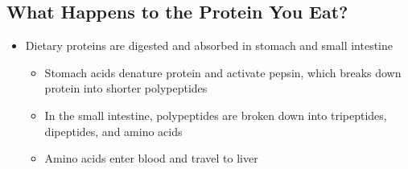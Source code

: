 \documentclass[12pt]{article}
\begin{document}
        \subsection{What Happens to the Protein You Eat?}
            \begin{itemize}
                \item Dietary proteins are digested and absorbed in stomach and small intestine
                    \begin{itemize}
                        \item Stomach acids denature protein and activate pepsin, which breaks down protein into shorter polypeptides
                        \item In the small intestine, polypeptides are broken down into tripeptides, dipeptides, and amino acids
                        \item Amino acids enter blood and travel to liver
                    \end{itemize}
            \end{itemize}
\end{document}
